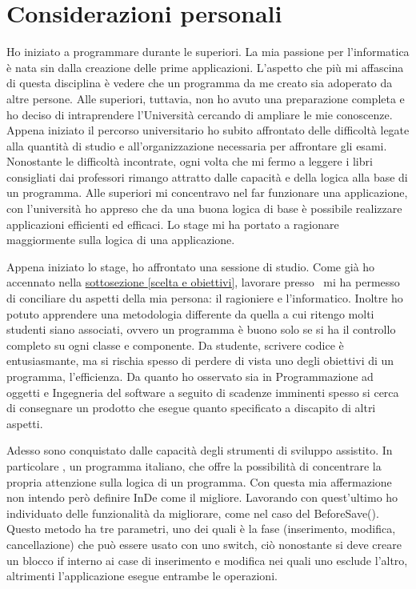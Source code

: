 \section{Considerazioni personali}
Ho iniziato a programmare durante le superiori. La mia passione per l'informatica è nata sin dalla creazione delle prime applicazioni. L'aspetto che più mi affascina di questa disciplina è vedere che un programma da me creato sia adoperato da altre persone. Alle superiori, tuttavia, non ho avuto una preparazione completa e ho deciso di intraprendere l'Università cercando di ampliare le mie conoscenze. Appena iniziato il percorso universitario ho subito affrontato delle difficoltà legate alla quantità di studio e all'organizzazione necessaria per affrontare gli esami. Nonostante le difficoltà incontrate, ogni volta che mi fermo a leggere i libri consigliati dai professori rimango attratto dalle capacità e della logica alla base di un programma. 
Alle superiori mi concentravo nel far funzionare una applicazione, con l'università ho appreso che da una buona logica di base è possibile realizzare applicazioni efficienti ed efficaci. Lo stage mi ha portato a ragionare maggiormente sulla logica di una applicazione.

Appena iniziato lo stage, ho affrontato una sessione di studio. Come già ho accennato nella \hyperref[scelta e obiettivi]{sottosezione \ref{scelta e obiettivi}}, lavorare presso \azienda\ mi ha permesso di conciliare du aspetti della mia persona: il ragioniere e l'informatico. Inoltre ho potuto apprendere una metodologia differente da quella a cui ritengo molti studenti siano associati, ovvero un programma è buono solo se si ha il controllo completo su ogni classe e componente. 
Da studente, scrivere codice è entusiasmante, ma si rischia spesso di perdere di vista uno degli obiettivi di un programma, l'efficienza. Da quanto ho osservato sia in Programmazione ad oggetti e Ingegneria del software a seguito di scadenze imminenti spesso si cerca di consegnare un prodotto che esegue quanto specificato a discapito di altri aspetti.

Adesso sono conquistato dalle capacità degli strumenti di sviluppo assistito. In particolare \inde, un programma italiano, che offre la possibilità di concentrare la propria attenzione sulla logica di un programma.  
Con questa mia affermazione non intendo però definire InDe come il migliore. Lavorando con quest'ultimo ho individuato delle funzionalità da migliorare, come nel caso del BeforeSave(). Questo metodo ha tre parametri, uno dei quali è la fase (inserimento, modifica, cancellazione) che può essere usato con uno switch, ciò nonostante si deve creare un blocco if interno ai case di inserimento e modifica nei quali uno esclude l'altro, altrimenti l'applicazione esegue entrambe le operazioni.\\


